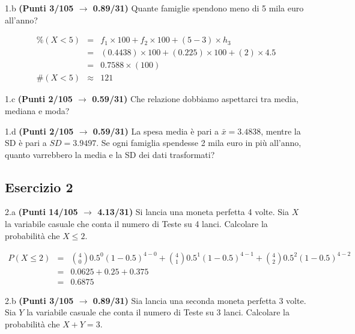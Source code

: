 \documentclass[
  11pt,
]{book}
\theoremstyle{mytheoremstyle}
\theoremstyle{mydefstyle}
\newenvironment{sol}
  {
  \begin{tcolorbox}[enhanced,breakable,arc=0.1mm,boxrule=1pt,colback=white,colframe=iblue,
  title=\bf \fontfamily{lmss}\selectfont \hspace{.5 cm} Soluzione,drop fuzzy shadow]

}{
\end{tcolorbox}
  }
\begin{document}
1.b \textbf{(Punti 3/105 \(\rightarrow\) 0.89/31)} Quante famiglie spendono meno di 5 mila euro all'anno?

\begin{sol}
\begin{eqnarray*}
     \%(X< 5 ) &=&  f_{ 1 }\times 100+f_{ 2 }\times 100 +( 5 - 3 )\times h_{ 3 } \\
              &=&  ( 0.4438 )\times 100+( 0.225 )\times 100 +( 2 )\times  4.5  \\
              &=&  0.7588 \times(100) \\
     \#(X< 5 ) &\approx& 121 
         \end{eqnarray*}

\end{sol}

1.c \textbf{(Punti 2/105 \(\rightarrow\) 0.59/31)} Che relazione dobbiamo aspettarci tra media, mediana e moda?

1.d \textbf{(Punti 2/105 \(\rightarrow\) 0.59/31)} La spesa media è pari a \(\bar x=3.4838\), mentre la SD è pari a \(SD=3.9497\).
Se ogni famiglia spendesse 2 mila euro in più all'anno, quanto varrebbero la media e la SD dei dati trasformati?

\subsection{Esercizio 2}\label{esercizio-2-34}

2.a \textbf{(Punti 14/105 \(\rightarrow\) 4.13/31)} Si lancia una moneta perfetta 4 volte. Sia \(X\) la variabile casuale che conta il numero di Teste su 4 lanci. Calcolare la probabilità che \(X\leq 2\).

\begin{sol}
\normalsize 
\begin{eqnarray*}
      P( X \leq 2 ) &=& \binom{ 4 }{ 0 } 0.5 ^{ 0 }(1- 0.5 )^{ 4 - 0 }+\binom{ 4 }{ 1 } 0.5 ^{ 1 }(1- 0.5 )^{ 4 - 1 }+\binom{ 4 }{ 2 } 0.5 ^{ 2 }(1- 0.5 )^{ 4 - 2 } \\                 &=& 0.0625+0.25+0.375 \\                 &=& 0.6875 
   \end{eqnarray*}
\normalsize 

\end{sol}

2.b \textbf{(Punti 3/105 \(\rightarrow\) 0.89/31)} Sia lancia una seconda moneta perfetta 3 volte. Sia \(Y\) la variabile casuale che conta il numero di Teste su 3 lanci. Calcolare la probabilità che \(X+Y=3\).
\end{document}
